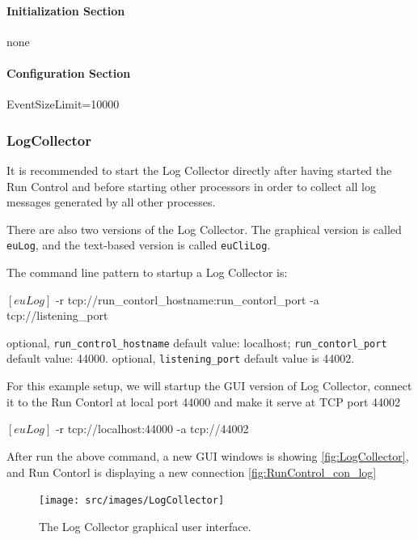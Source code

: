 \paragraph{Initialization Section}
none

\paragraph{Configuration Section}
\begin{listing}[conf]
[RunControl]
EventSizeLimit=10000
\end{listing}

\subsubsection{LogCollector}
\label{sec:logcollector}
It is recommended to start the Log Collector directly after having started the Run Control and before starting other processors in order to collect all log messages generated by all other processes.

There are also two versions of the Log Collector.
The graphical version is called \texttt{euLog},
and the text-based version is called \texttt{euCliLog}.

The command line pattern to startup a Log Collector is:
\begin{listing}[mybash]
$[euLog]$ -r tcp://{run_contorl_hostname}:{run_contorl_port} -a tcp://{listening_port}
\end{listing}

\begin{description}
optional, \texttt{run\_control\_hostname} default value: localhost;  \texttt{run\_contorl\_port}  default value: 44000.
optional, \texttt{listening\_port} default value is 44002.
\end{description}

For this example setup, we will startup the GUI version of Log Collector, connect it to the Run Contorl at local port 44000 and make it serve at TCP port 44002\\
\begin{listing}[mybash]
$[euLog]$ -r tcp://localhost:44000 -a tcp://44002
\end{listing}

After run the above command, a new GUI windows is showing \autoref{fig:LogCollector}, and Run Contorl is displaying a new connection \autoref{fig:RunControl_con_log}
\begin{figure}[htb]
  \begin{center}
    \texttt{[image: src/images/LogCollector]}
    \caption{The Log Collector graphical user interface.}
    \label{fig:LogCollector}
  \end{center}
\end{figure}


